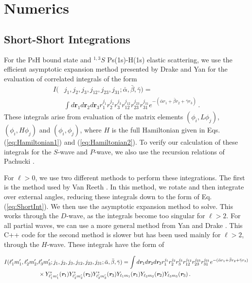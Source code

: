 \documentclass[preprint,showpacs,showkeys,preprintnumbers,amsmath,amssymb,longbibliography,pra,aps]{revtex4-1}
\begin{document}
\section{Numerics}
\label{sec:Numerical}

\subsection{Short-Short Integrations}
\label{sec:ShortInt}
For the PsH bound state and $^{1,3}S$ Ps(1s)-H(1s) elastic scattering, we use
the efficient asymptotic expansion method presented by Drake and Yan
\cite{Drake1995} for the evaluation of correlated integrals of the form
\begin{align}
\label{eq:ShortInt}
I(&j_1,j_2,j_3,j_{12},j_{23},j_{31}; \bar{\alpha}, \bar{\beta}, \bar{\gamma}) =
  \nonumber \\
&\int
d \textbf{r}_1 d \textbf{r}_2 d \textbf{r}_3
r_1^{j_1} r_2^{j_2} r_3^{j_3} r_{12}^{j_{12}}
r_{23}^{j_{23}} r_{31}^{j_{31}}
e^{-(\bar{\alpha} r_1 + \bar{\beta} r_2 + \bar{\gamma} r_3)}\, .
\end{align}
These integrals arise from evaluation of the matrix elements
$(\phi_i, L \phi_j)$, $(\phi_i, H \phi_j)$ and $(\phi_i, \phi_j)$, where $H$
is the full Hamiltonian given in Eqs. (\ref{eq:Hamiltonian1}) and
(\ref{eq:Hamiltonian2}). To verify our calculation of these integrals for the
$S$-wave and $P$-wave, we also use the recursion relations of Pachucki
\cite{Pachucki2004}.

For $\ell > 0$, we use two different methods to perform these integrations. 
The first is the method used by Van Reeth \cite{VanReethThesis}. In this 
method, we rotate and then integrate over external angles, reducing these 
integrals down to the form of Eq. (\ref{eq:ShortInt}). We then use the 
asymptotic expansion method \cite{Drake1995} to solve. This works through the 
$D$-wave, as the integrals become too singular for $\ell > 2$. For all partial 
waves, we can use a more general method from Yan and Drake \cite{Yan1997}. 
This C++ code for the second method is slower but has been used mainly for
$\ell > 2$, through the $H$-wave. These integrals have the form of
\begin{widetext}
\begin{align}
\label{eq:ShortIntGen}
\nonumber I(\ell_1^\prime m_1^\prime, \ell_2^\prime m_2^\prime, &\ell_3^\prime m_3^\prime; j_1,j_2,j_3,j_{12},j_{23},j_{31}; \bar{\alpha}, \bar{\beta}, \bar{\gamma}) = \int d \textit{\textbf{r}}_1 d \textit{\textbf{r}}_2 d \textit{\textbf{r}}_3
r_1^{j_1} r_2^{j_2} r_3^{j_3} r_{12}^{j_{12}}
r_{23}^{j_{23}} r_{31}^{j_{31}}
e^{-(\bar{\alpha} r_1 + \bar{\beta} r_2 + \bar{\gamma} r_3)} \\
& \times Y_{\ell_1^\prime m_1^\prime}^* (\textit{\textbf{r}}_1) Y_{\ell_2^\prime m_2^\prime}^* (\textit{\textbf{r}}_2) Y_{\ell_3^\prime m_3^\prime}^* (\textit{\textbf{r}}_3) Y_{\ell_1 m_1} (\textit{\textbf{r}}_1) Y_{\ell_2 m_2} (\textit{\textbf{r}}_2) Y_{\ell_3 m_3} (\textit{\textbf{r}}_3)\, .
\end{align}
\end{widetext}
\end{document}
